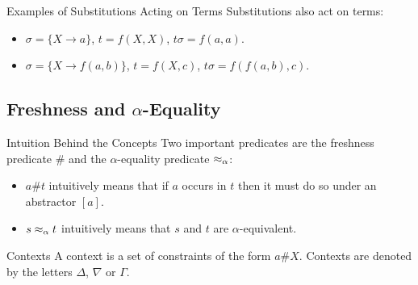 \begin{frame}{Examples of Substitutions Acting on Terms}
    Substitutions also act on terms: 
    \begin{itemize}
        \item $\sigma = \{X \rightarrow a\}$, $t = f(X, X)$, $t\sigma = f(a, a)$.
        \item $\sigma = \{X \rightarrow f(a, b)\}$, $t = f(X, c)$, $t\sigma = f(f(a, b), c)$.
    \end{itemize}
\end{frame}

\subsection{Freshness and $\alpha$-Equality}

\begin{frame}{Intuition Behind the Concepts}
    Two important predicates are the freshness predicate $\#$ and the $\alpha$-equality
    predicate $\mathrel{\approx_\alpha}$: 
    \begin{itemize}
        \item $a\#t$ intuitively means that if $a$ occurs in $t$ then it must do so
            under an abstractor $[a]$. 
        \item $s \mathrel{\approx_\alpha} t$ intuitively means that $s$ and $t$ are $\alpha$-equivalent.
    \end{itemize}
\end{frame}

\begin{frame}{Contexts}
    A context is a set of constraints of the form $a\#X$. Contexts are denoted by the letters
    $\Delta$, $\nabla$ or $\Gamma$.
\end{frame}

